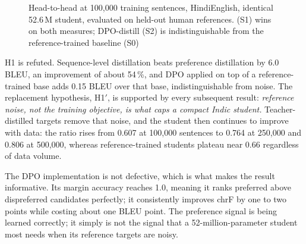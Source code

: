 \begin{figure}[H]
\centering
{}
\caption{Head-to-head at 100{,}000 training sentences, Hindi\arrowto{}English,
identical 52.6\,M student, evaluated on held-out human references. \seqkd{}
(S1) wins on both measures; DPO-distill (S2) is indistinguishable from the
reference-trained baseline (S0)}
\label{fig:h1}
\end{figure}

H1 is refuted. Sequence-level distillation beats preference distillation by
6.0 BLEU, an improvement of about 54\,\%, and DPO applied on top of a
reference-trained base adds 0.15 BLEU over that base, indistinguishable from
noise. The replacement hypothesis, H1$'$, is supported by every subsequent
result: \emph{reference noise, not the training objective, is what caps a
compact Indic student.} Teacher-distilled targets remove that noise, and the
student then continues to improve with data: the ratio rises from 0.607 at
100{,}000 sentences to 0.764 at 250{,}000 and 0.806 at 500{,}000, whereas
reference-trained students plateau near 0.66 regardless of data volume.

\enlargethispage{2\baselineskip}
The DPO implementation is not defective, which is what makes the result
informative. Its margin accuracy reaches 1.0, meaning it ranks preferred above
dispreferred candidates perfectly; it consistently improves chrF by one to two
points while costing about one BLEU point. The preference signal is being
learned correctly; it simply is not the signal that a 52-million-parameter
student most needs when its reference targets are noisy.
